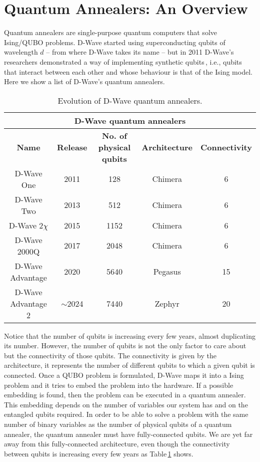 \section{Quantum Annealers: An Overview} 
Quantum annealers are single-purpose quantum computers that solve Ising/QUBO problems. D-Wave started using superconducting qubits of wavelength $d$ -- from where D-Wave takes its name -- but in 2011 D-Wave's researchers demonstrated a way of implementing synthetic qubits\,\cite{Johnson2011QuantumSpins}, i.e., qubits that interact between each other and whose behaviour is that of the Ising model. Here we show a list of D-Wave's quantum annealers.
\begin{table}[H]
\centering
\begin{tabular}{ |c|c|c|c|c|  }
 \hline
 \multicolumn{5}{|c|}{\textbf{D-Wave quantum annealers}} \\
 \hline
 \textbf{Name} & \textbf{Release} & \textbf{No. of physical qubits} & \textbf{Architecture} & \textbf{Connectivity}\\
 \hline
 D-Wave One         & 2011 & 128      & Chimera & 6\\
  \hline
 D-Wave Two         & 2013 & 512      & Chimera & 6\\
  \hline
 D-Wave 2$\chi$     & 2015 & 1152     & Chimera & 6\\
  \hline
 D-Wave 2000Q       & 2017 & 2048     & Chimera & 6\\
  \hline
 D-Wave Advantage   & 2020 & 5640     & Pegasus & 15\\
  \hline
 D-Wave Advantage 2 & $\sim$2024 & 7440 & Zephyr  & 20\\
 \hline
\end{tabular}
\caption{Evolution of D-Wave quantum annealers.}
\label{tab:DwaveAnnealers}
\end{table}
Notice that the number of qubits is increasing every few years, almost duplicating its number. However, the number of qubits is not the only factor to care about but the connectivity of those qubits. The connectivity is given by the architecture, it represents the number of different qubits to which a given qubit is connected. Once a QUBO problem is formulated, D-Wave maps it into a Ising problem and it tries to embed the problem into the hardware. If a possible embedding is found, then the problem can be executed in a quantum annealer. This embedding depends on the number of variables our system has and on the entangled qubits required. In order to be able to solve a problem with the same number of binary variables as the number of physical qubits of a quantum annealer, the quantum annealer must have fully-connected qubits. We are yet far away from this fully-connected architecture, even though the connectivity between qubits is increasing every few years as Table\,\ref{tab:DwaveAnnealers} shows.
